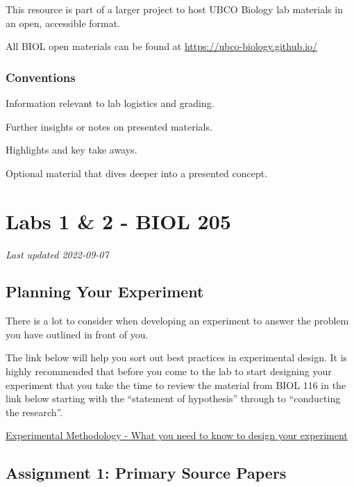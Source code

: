 \documentclass[
]{book}
\begin{document}
This resource is part of a larger project to host UBCO Biology lab materials in an open, accessible format.

All BIOL open materials can be found at \url{https://ubco-biology.github.io/}

\hypertarget{conventions}{%
\section*{Conventions}\label{conventions}}

Information relevant to lab logistics and grading.

Further insights or notes on presented materials.

Highlights and key take aways.

Optional material that dives deeper into a presented concept.

\hypertarget{part-labs-1-2---biol-205}{%
\part*{Labs 1 \& 2 - BIOL 205}\label{part-labs-1-2---biol-205}}

\emph{Last updated 2022-09-07}

\hypertarget{planning-your-experiment}{%
\chapter*{Planning Your Experiment}\label{planning-your-experiment}}

There is a lot to consider when developing an experiment to answer the problem you have outlined in front of you.

The link below will help you sort out best practices in experimental design. It is highly recommended that before you come to the lab to start designing your experiment that you take the time to review the material from BIOL 116 in the link below starting with the ``statement of hypothesis'' through to ``conducting the research''.

\href{https://ubco-biology.github.io/BIOL-116-Lab-Manual/statement-of-hypothesis.html}{Experimental Methodology - What you need to know to design your experiment}

\hypertarget{assignment-1-primary-source-papers}{%
\chapter*{Assignment 1: Primary Source Papers}\label{assignment-1-primary-source-papers}}
\end{document}
